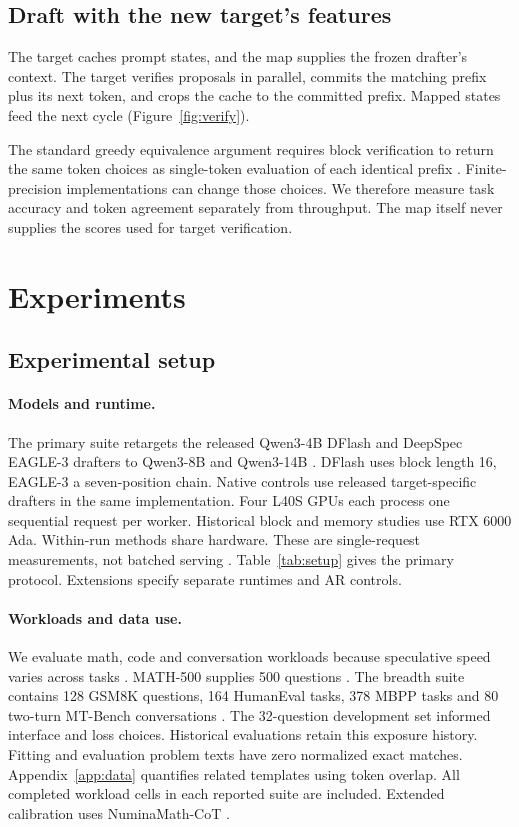 \documentclass{article}
\begin{document}
\subsection{Draft with the new target's features}
The target caches prompt states, and the map supplies the frozen
drafter's context. The target verifies proposals in parallel, commits
the matching prefix plus its next token, and crops the cache to the
committed prefix. Mapped states feed the next cycle (Figure~\ref{fig:verify}).

The standard greedy equivalence argument requires block verification to
return the same token choices as single-token evaluation of each identical
prefix \citep{leviathan2023speculative}. Finite-precision implementations
can change those choices. We therefore measure task accuracy and token
agreement separately from throughput. The map itself never supplies the
scores used for target verification.

\section{Experiments}
\subsection{Experimental setup}
\label{sec:setup}

\paragraph{Models and runtime.}
The primary suite retargets the released Qwen3-4B DFlash and DeepSpec EAGLE-3 drafters to
Qwen3-8B and Qwen3-14B \citep{yang2025qwen3,deepspec2026software}.
DFlash uses block length 16, EAGLE-3 a seven-position chain. Native
controls use released target-specific drafters in the same implementation.
Four L40S GPUs each process one sequential request per worker. Historical
block and memory studies use RTX 6000 Ada. Within-run methods share
hardware. These are single-request measurements, not batched serving
\citep{kwon2023pagedattention,zheng2024sglang}. Table~\ref{tab:setup} gives
the primary protocol. Extensions specify separate runtimes and AR controls.

\paragraph{Workloads and data use.}
We evaluate math, code and conversation workloads because speculative
speed varies across tasks \citep{xia2024specbench,abramovich2026speedbench}.
MATH-500 supplies 500 questions \citep{lightman2023verify}. The breadth suite contains 128 GSM8K
questions, 164 HumanEval tasks, 378 MBPP tasks and 80 two-turn MT-Bench
conversations \citep{hendrycks2021math,cobbe2021gsm8k,chen2021humaneval,austin2021mbpp,zheng2023mtbench}.
The 32-question development set informed interface and loss choices.
Historical evaluations retain this exposure history. Fitting and evaluation
problem texts have zero normalized exact matches. Appendix~\ref{app:data}
quantifies related templates using token overlap. All completed workload
cells in each reported suite are included. Extended calibration uses
NuminaMath-CoT \citep{li2024numinamath}.
\end{document}
